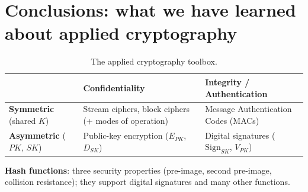 \section{Conclusions: what we have learned about applied cryptography}
\begin{table}[h]
\centering
\begin{tabular}{@{}p{3.2cm}p{6.3cm}p{6.3cm}@{}}
\toprule
 & \textbf{Confidentiality} & \textbf{Integrity / Authentication} \\
\midrule
\raggedright \textbf{Symmetric} (shared $K$) & \raggedright Stream ciphers, block ciphers (+ modes of operation) & \raggedright Message Authentication Codes (MACs) \tabularnewline
\addlinespace
\raggedright \textbf{Asymmetric} ($PK$, $SK$) & \raggedright Public-key encryption ($E_{PK}$, $D_{SK}$) & \raggedright Digital signatures ($\mathrm{Sign}_{SK}$, $V_{PK}$) \tabularnewline
\bottomrule
\end{tabular}
\caption{The applied cryptography toolbox.}
\end{table}

\textbf{Hash functions}: three security properties (pre-image, second pre-image, collision resistance); they support digital signatures and many other functions.

